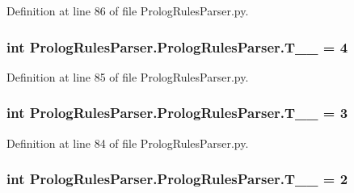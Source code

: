 Definition at line 86 of file Prolog\+Rules\+Parser.\+py.

\hypertarget{class_prolog_rules_parser_1_1_prolog_rules_parser_aece390dc6b10828f2a0f04d0d47a8b57}{}
\subsubsection[{T\+\_\+\+\_\+5}]{\setlength{\rightskip}{0pt plus 5cm}int Prolog\+Rules\+Parser.\+Prolog\+Rules\+Parser.\+T\+\_\+\+\_ = 4\hspace{0.3cm}{\ttfamily [static]}}\label{class_prolog_rules_parser_1_1_prolog_rules_parser_aece390dc6b10828f2a0f04d0d47a8b57}


Definition at line 85 of file Prolog\+Rules\+Parser.\+py.

\hypertarget{class_prolog_rules_parser_1_1_prolog_rules_parser_ab1468d401c196881a49f2600042d6d64}{}
\subsubsection[{T\+\_\+\+\_\+6}]{\setlength{\rightskip}{0pt plus 5cm}int Prolog\+Rules\+Parser.\+Prolog\+Rules\+Parser.\+T\+\_\+\+\_ = 3\hspace{0.3cm}{\ttfamily [static]}}\label{class_prolog_rules_parser_1_1_prolog_rules_parser_ab1468d401c196881a49f2600042d6d64}


Definition at line 84 of file Prolog\+Rules\+Parser.\+py.

\hypertarget{class_prolog_rules_parser_1_1_prolog_rules_parser_a53e7558944feb7cfe1e8bfb1767384ef}{}
\subsubsection[{T\+\_\+\+\_\+7}]{\setlength{\rightskip}{0pt plus 5cm}int Prolog\+Rules\+Parser.\+Prolog\+Rules\+Parser.\+T\+\_\+\+\_ = 2\hspace{0.3cm}{\ttfamily [static]}}\label{class_prolog_rules_parser_1_1_prolog_rules_parser_a53e7558944feb7cfe1e8bfb1767384ef}


